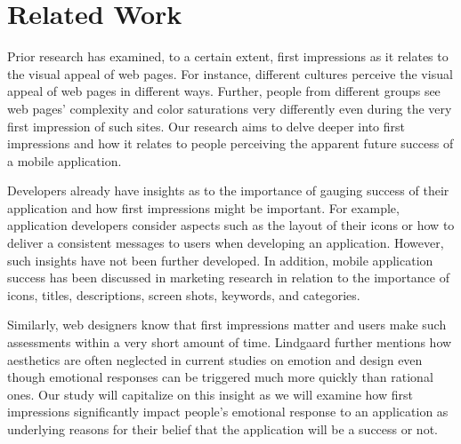 \section{Related Work}


Prior research has examined, to a certain extent, first impressions as it relates to the visual appeal of web pages. For instance, different cultures perceive the visual appeal of web pages in different ways\cite{Reinecke:2013:PUF:2470654.2481281}. Further, people from different groups see web pages' complexity and color saturations very differently even during the very first impression of such sites\cite{Reinecke:2013:PUF:2470654.2481281}. Our research aims to delve deeper into first impressions and how it relates to people perceiving the apparent future success of a mobile application.

Developers already have insights as to the importance of gauging success of their application and how first impressions might be important\cite{wooldridge2010the}. For example, application developers consider aspects such as the layout of their icons or how to deliver a consistent messages to users when developing an application. However, such insights have not been further developed. In addition, mobile application success has been discussed in marketing research in relation to the importance of icons, titles, descriptions, screen shots, keywords, and categories\cite{mureta12:app}.

Similarly, web designers know that first impressions matter and users make such assessments within a very short amount of time\cite{needsource-attentionwebdesigners}. Lindgaard\cite{needsource-attentionwebdesigners} further mentions how aesthetics are often neglected in current studies on emotion and design even though emotional responses can be triggered much more quickly than rational ones. Our study will capitalize on this insight as we will examine how first impressions  significantly impact people's emotional response to an application as underlying reasons for their belief that the application will be a success or not.
